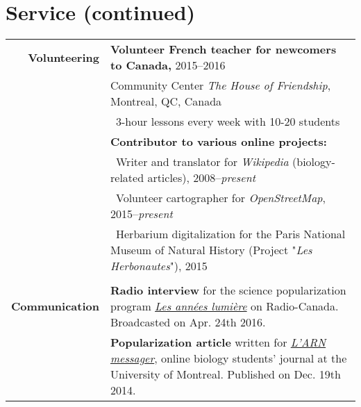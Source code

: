 \documentclass[letterpaper,10pt]{article}
\begin{document}
\section*{Service \small{(continued)}}
\begin{tabular}{r|p{13.5cm}}

\textbf{Volunteering}

 & \textbf{Volunteer French teacher for newcomers to Canada,} 2015--2016 \\
 & Community Center \emph{The House of Friendship}, Montreal, QC, Canada \\
 & \textbullet{}~3-hour lessons every week with 10-20 students
   \vspace{2mm} \\

 & \textbf{Contributor to various online projects:} \\
 & \textbullet{}~Writer and translator for \emph{Wikipedia}
   (biology-related articles), 2008--\emph{present} \\
 & \textbullet{}~Volunteer cartographer for \emph{OpenStreetMap},
   2015--\emph{present} \\
 & \textbullet{}~Herbarium digitalization for the Paris National Museum
   of Natural History (Project "\emph{Les Herbonautes}"), 2015 \\

\multicolumn{2}{c}{} \\

\textbf{Communication}

& \textbf{Radio interview} for the science popularization program
  \href{http://ici.radio-canada.ca/emissions/les_annees_lumiere/2009-2010/chronique.asp?idChronique=404672}{\emph{Les années lumière}} on Radio-Canada.
  Broadcasted on Apr. 24th 2016.
  \vspace{2mm} \\

& \textbf{Popularization article} written for
  \href{http://arnmessager.com/2014/12/19/les-mots-damour-des-plantes-a-fleurs/}
  {\emph{L'ARN messager}}, online biology students' journal at the
  University of Montreal. Published on Dec. 19th 2014. \\

\end{tabular}

\bigskip
\bigskip


\end{document}

